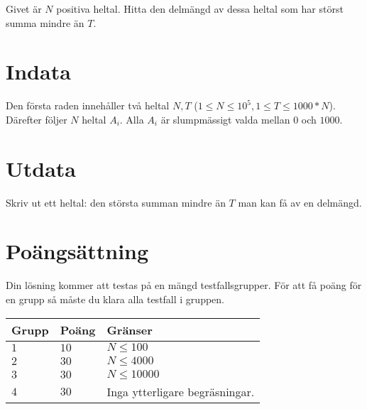 Givet är $N$ positiva heltal. Hitta den delmängd av dessa heltal som har störst summa mindre än $T$. 


\section*{Indata}
Den första raden innehåller två heltal $N, T$ ($1 \leq N \leq 10^5, 1 \leq T \leq 1000*N$).
Därefter följer $N$ heltal $A_i$. Alla $A_i$ är slumpmässigt valda mellan $0$ och $1000$.
\section*{Utdata}
Skriv ut ett heltal: den största summan mindre än $T$ man kan få av en delmängd.

\section*{Poängsättning}
Din lösning kommer att testas på en mängd testfallsgrupper.
För att få poäng för en grupp så måste du klara alla testfall i gruppen.

\noindent
\begin{tabular}{| l | l | p{12cm} |}
  \hline
  \textbf{Grupp} & \textbf{Poäng} & \textbf{Gränser} \\ \hline
  $1$    & $10$      & $N \leq 100$ \\ \hline
  $2$    & $30$      & $N \leq 4000$ \\ \hline
  $3$    & $30$      & $N \leq 10000$ \\ \hline 
  $4$    & $30$      & Inga ytterligare begräsningar. \\ \hline
\end{tabular}

